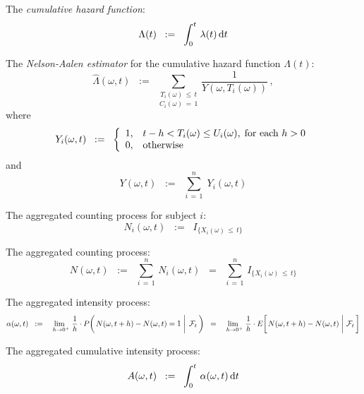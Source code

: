 \noindent
The \textit{cumulative hazard function}:
\begin{equation*}
\Lambda(t) \;\; := \;\; \int_{0}^{t}\,\lambda(t)\,\textnormal{d} t
\end{equation*}

\noindent
The \textit{Nelson-Aalen estimator} for the cumulative hazard function $\Lambda(t)$:
\begin{equation*}
\widehat{\Lambda}(\omega,t)
\;\; := \;\;
\underset{C_{i}(\omega)\,=\,1}{\underset{T_{i}(\omega)\,\leq\,t}{\sum}}\,
\dfrac{1}{Y(\omega,T_{i}(\omega))}\,,
\end{equation*}
where
\begin{equation*}
Y_{i}(\omega,t)
\;\; := \;\;
\left\{\begin{array}{cl}
1, & t - h < T_{i}(\omega) \leq U_{i}(\omega), \;\textnormal{for each $h > 0$} \\
0, & \textnormal{otherwise}
\end{array}\right.
\end{equation*}
and
\begin{equation*}
Y(\omega,t) \;\; := \;\; \overset{n}{\underset{i\,=\,1}{\sum}}\; Y_{i}(\omega,t)
\end{equation*}

\vskip 0.5cm
\noindent
The aggregated counting process for subject $i$:
\begin{equation*}
N_{i}(\omega,t) \;\;:=\;\; I_{\{X_{i}(\omega)\,\leq\,t\}}
\end{equation*}

\noindent
The aggregated counting process:
\begin{equation*}
N(\omega,t)
\;\;:=\;\; \overset{n}{\underset{i\,=\,1}{\sum}}\,N_{i}(\omega,t)
\;\;=\;\;  \overset{n}{\underset{i\,=\,1}{\sum}}\,I_{\{X_{i}(\omega)\,\leq\,t\}}
\end{equation*}

\noindent
The aggregated intensity process:
\begin{equation*}
\alpha(\omega,t)
\;\; := \;\; \underset{\mbox{}\;\;h\rightarrow 0^{+}}{\lim} \;
	\dfrac{1}{h} \cdot P\!\left(\left.
	N(\omega,t+h) \overset{{\color{white}1}}{-} N(\omega,t) = 1
	\;\right\vert\;\mathcal{F}_{t}\,\right)
\;\; = \;\; \underset{\mbox{}\;\;h\rightarrow 0^{+}}{\lim} \;
	\dfrac{1}{h} \cdot E\!\left[\left.
	N(\omega,t+h) \overset{{\color{white}1}}{-} N(\omega,t)
	\;\right\vert\,\mathcal{F}_{t}\,\right]
\end{equation*}

\noindent
The aggregated cumulative intensity process:
\begin{equation*}
A(\omega,t) \;\; := \;\; \int^{t}_{0}\,\alpha(\omega,t)\,\textnormal{d} t
\end{equation*}

